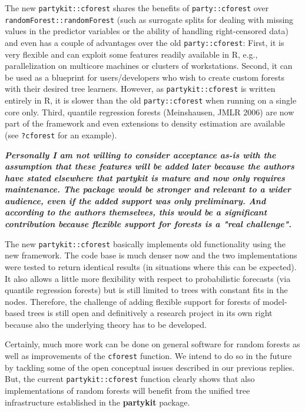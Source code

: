 \documentclass{article}
\begin{document}
\smallskip

The new \texttt{partykit::cforest} shares the benefits of
\texttt{party::cforest} over \texttt{randomForest::randomForest} (such as surrogate
splits for dealing with missing values in the predictor variables or the
ability of handling right-censored data) and even has a couple of
advantages over the old \texttt{party::cforest}: First, it is very flexible
and can exploit some features readily available in R, e.g., parallelization
on multicore machines or clusters of workstations.  Second, it can be used
as a blueprint for users/developers who wish to create custom forests with
their desired tree learners.  However, as \texttt{partykit::cforest} is
written entirely in R, it is slower than the old \texttt{party::cforest}
when running on a single core only. Third, quantile regression forests
(Meinshausen, JMLR 2006) are now part of the framework and even extensions
to density estimation are available (see \texttt{?cforest} for an example).

\textbf{\textit{%
Personally I am not willing to consider acceptance as-is with the assumption
that these features will be added later because the authors have stated
elsewhere that partykit is mature and now only requires maintenance.
The package would be stronger and relevant to a wider audience, even if the
added support was only preliminary.  And according to the authors
themselves, this would be a significant contribution because flexible
support for forests is a "real challenge".
}}

\smallskip

The new \texttt{partykit::cforest} basically implements old functionality
using the new framework. The code base is much denser now and the two
implementations were tested to return identical results (in situations where
this can be expected). It also allows a little more flexibility with respect
to probabilistic forecasts (via quantile regression forests) but is still
limited to trees with constant fits in the nodes. Therefore, the challenge
of adding flexible support for forests of model-based trees is still open and
definitively a research project in its own right because also the underlying
theory has to be developed.

Certainly, much more work can be done on general software for random forests
as well as improvements of the \texttt{cforest} function.  We intend to do
so in the future by tackling some of the open conceptual issues described in
our previous replies.  But, the current \texttt{partykit::cforest} function
clearly shows that also implementations of random forests will benefit from
the unified tree infrastructure established in the \textbf{partykit} package.
\end{document}
